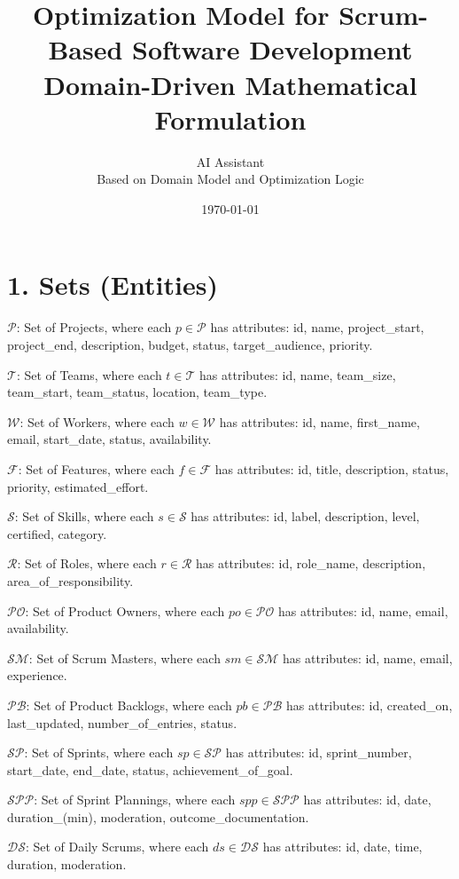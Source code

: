 \documentclass[12pt]{article}
\title{\Huge Optimization Model for Scrum-Based Software Development \\ \Large Domain-Driven Mathematical Formulation}
\author{\Large AI Assistant \\ \large Based on Domain Model and Optimization Logic}
\date{\today}
\begin{document}
\maketitle
\tableofcontents
\newpage

\section{1. Sets (Entities)}
\item $\mathcal{P}$: Set of Projects, where each $p \in \mathcal{P}$ has attributes: id, name, project\_start, project\_end, description, budget, status, target\_audience, priority.
    \item $\mathcal{T}$: Set of Teams, where each $t \in \mathcal{T}$ has attributes: id, name, team\_size, team\_start, team\_status, location, team\_type.
    \item $\mathcal{W}$: Set of Workers, where each $w \in \mathcal{W}$ has attributes: id, name, first\_name, email, start\_date, status, availability.
    \item $\mathcal{F}$: Set of Features, where each $f \in \mathcal{F}$ has attributes: id, title, description, status, priority, estimated\_effort.
    \item $\mathcal{S}$: Set of Skills, where each $s \in \mathcal{S}$ has attributes: id, label, description, level, certified, category.
    \item $\mathcal{R}$: Set of Roles, where each $r \in \mathcal{R}$ has attributes: id, role\_name, description, area\_of\_responsibility.
    \item $\mathcal{PO}$: Set of Product Owners, where each $po \in \mathcal{PO}$ has attributes: id, name, email, availability.
    \item $\mathcal{SM}$: Set of Scrum Masters, where each $sm \in \mathcal{SM}$ has attributes: id, name, email, experience.
    \item $\mathcal{PB}$: Set of Product Backlogs, where each $pb \in \mathcal{PB}$ has attributes: id, created\_on, last\_updated, number\_of\_entries, status.
    \item $\mathcal{SP}$: Set of Sprints, where each $sp \in \mathcal{SP}$ has attributes: id, sprint\_number, start\_date, end\_date, status, achievement\_of\_goal.
    \item $\mathcal{SPP}$: Set of Sprint Plannings, where each $spp \in \mathcal{SPP}$ has attributes: id, date, duration\_(min), moderation, outcome\_documentation.
    \item $\mathcal{DS}$: Set of Daily Scrums, where each $ds \in \mathcal{DS}$ has attributes: id, date, time, duration, moderation.
\end{document}
